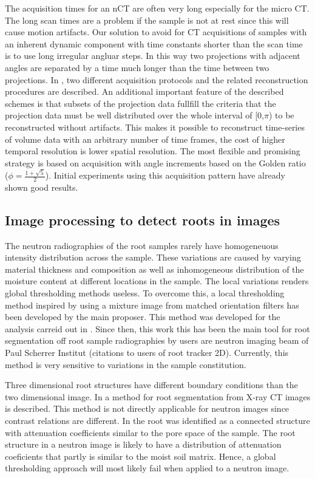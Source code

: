 \documentclass[a4paper,11pt]{scrreprt}
\begin{document}
The acquisition times for an nCT are often very long especially for the micro CT. 
The long scan times are a problem if the sample is not at rest since this will 
cause motion artifacts. Our solution to avoid for CT acquisitions of samples 
with an inherent dynamic component with time constants shorter than the scan time
is to use long irregular angluar steps. In this way two projections with adjacent 
angles are separated by a time much longer than the time between two projections. In
\cite{kaestner2011_golden}, two different acquisition protocols and the related
reconstruction procedures are described. An additional important feature of the described
schemes is that subsets of the projection data fullfill the criteria that the
projection data must be well distributed over the whole interval of [0,$\pi$) to be
reconstructed without artifacts. This makes it possible to reconstruct
time-series of volume data with an arbitrary number of time frames, the cost of
higher temporal resolution is lower spatial resolution. The most flexible and
promising strategy is based on acquisition with angle increments based on the Golden
ratio ($\phi=\frac{1+\sqrt{5}}{2}$). Initial experiments using this acquisition 
pattern have already shown good results.

\subsection{Image processing to detect roots in images}
The neutron radiographies of the root samples rarely have homogeneuous intensity
distribution across the sample. These variations are caused by varying material
thickness and composition as well as inhomogeneous distribution of  the moisture content at
different locations in the sample. The local variations renders global thresholding
methods useless. To overcome this, a local thresholding method inspired by \cite{hoover00} using
a mixture image from matched orientation filters has been developed  by the main proposer. 
This method was developed for the analysis carreid out in \cite{menon2007_NetronRoots}. 
Since then, this work this has been the main tool for root segmentation off root sample 
radiographies by users are neutron imaging beam of Paul Scherrer Institut 
(citations to users of root tracker 2D). Currently, this method is very sensitive 
to variations in the sample constitution. 

Three dimensional root structures have different boundary conditions than the
two dimensional image. In \cite{kaestner06a} a method for root segmentation from
X-ray CT images is described. This method is not directly applicable for neutron
images since contrast relations are different. In \cite{kaestner06a} the root
was identified as a connected structure with attenuation coefficients similar to
the pore space of the sample. The root structure in a neutron image is likely to
have a distribution of attenuation coeficients that partly is similar to the moist 
soil matrix. Hence, a global thresholding approach will most likely fail when applied
to a neutron image. 
\end{document}
